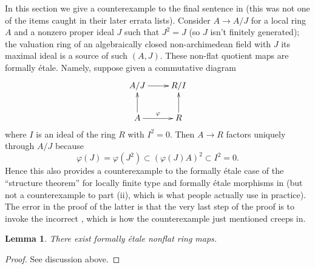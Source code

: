 \documentclass[10pt,a4paper]{amsart}
\theoremstyle{plain}
\newtheorem{lemma}[subsection]{Lemma}
\theoremstyle{definition}
\theoremstyle{remark}
\numberwithin{equation}{subsection}
\begin{document}
\noindent
In this section we give a counterexample to the final sentence in
\cite[0, Example 19.10.3(i)]{EGA} (this was not one of the items caught
in their later errata lists). Consider $A \to A/J$ for a local ring $A$
and a nonzero proper ideal $J$ such that $J^2 = J$ (so $J$ isn't finitely
generated); the valuation ring of an algebraically closed non-archimedean
field with $J$ its maximal ideal is a source of such $(A, J)$. These
non-flat quotient maps are formally \'etale. Namely, suppose given a
commutative diagram
$$
\xymatrix{
A/J \ar[r] & R/I \\
A \ar[u] \ar[r]^\varphi & R \ar[u]
}
$$
where $I$ is an ideal of the ring $R$ with $I^2 = 0$. Then $A \to R$
factors uniquely through $A/J$ because
$$
\varphi(J) = \varphi(J^2) \subset (\varphi(J)A)^2 \subset I^2 = 0.
$$
Hence this also provides a counterexample to the formally \'etale case
of the ``structure theorem'' for locally finite type and formally \'etale
morphisms in \cite[IV, Theorem 18.4.6(i)]{EGA}
(but not a counterexample to part (ii), which
is what people actually use in practice). The error in the proof of
the latter is that the very last step of the proof is to invoke the incorrect
\cite[0, Example 19.3.10(i)]{EGA},
which is how the counterexample just mentioned creeps in.


\begin{lemma}
\label{lemma-formally-etale-not-presented}
There exist formally \'etale nonflat ring maps.
\end{lemma}

\begin{proof}
See discussion above.
\end{proof}



\end{document}
